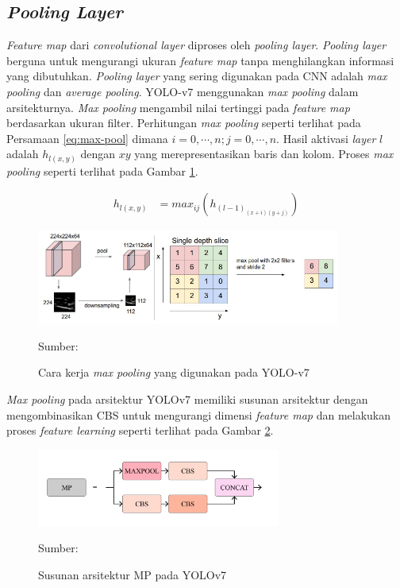     \subsection{\textit{Pooling Layer}}
    \textit{Feature map} dari \textit{convolutional layer} diproses oleh \textit{pooling layer}. \textit{Pooling layer} berguna untuk mengurangi ukuran \textit{feature map} tanpa menghilangkan informasi yang dibutuhkan. \textit{Pooling layer} yang sering digunakan pada CNN adalah \textit{max pooling} dan \textit{average pooling}. YOLO-v7 menggunakan \textit{max pooling} dalam arsitekturnya. \textit{Max pooling} mengambil nilai tertinggi pada \textit{feature map} berdasarkan ukuran filter. Perhitungan \textit{max pooling} seperti terlihat pada Persamaan \ref{eq:max-pool} dimana $i=0, \cdots, n;j=0, \cdots, n$. Hasil aktivasi \textit{layer} $l$ adalah $h_{l(x,y)}$ dengan $xy$ yang merepresentasikan baris dan kolom. Proses \textit{max pooling} seperti terlihat pada Gambar \ref{fig:max-pool}.

    \begin{align}
        \label{eq:max-pool}
        h_{l(x,y)} &= max_{ij}(h_{(l-1)_{(x+i)(y+j)}})
    \end{align}

    \begin{figure}[H]
        \centering
        \includegraphics[width=10cm]{img/bab2/maxpool.png}
        \caption{Cara kerja \textit{max pooling} yang digunakan pada YOLO-v7}
        \label{fig:max-pool}
        Sumber: \citep{Yani2019}
    \end{figure}

    \textit{Max pooling} pada arsitektur YOLOv7 memiliki susunan arsitektur dengan mengombinasikan CBS untuk mengurangi dimensi \textit{feature map} dan melakukan proses \textit{feature learning} seperti terlihat pada Gambar \ref{fig:mp}.

    \begin{figure}[H]
        \begin{center}
            \includegraphics[width=8cm]{img/bab2/mp.png}
            \caption{Susunan arsitektur MP pada YOLOv7}
            \label{fig:mp}
            Sumber: \citep{Wang2022}
        \end{center}
    \end{figure}

